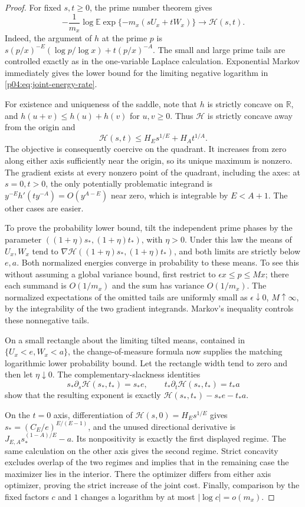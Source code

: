 \documentclass[11pt,letterpaper]{article}
\theoremstyle{definition}
\theoremstyle{remark}
\newcommand{\1}{\mathbf 1}
\begin{document}
\begin{proof}
For fixed $s,t\ge0$, the prime number theorem gives
\begin{equation}\label{p04:eq:joint-laplace-limit}
 -\frac1{m_x}\log\mathbb E
       \exp\{-m_x(sU_x+tW_x)\}
 \longrightarrow\mathcal H(s,t).
\end{equation}
Indeed, the argument of $h$ at the prime $p$ is
$s(p/x)^{-E}(\log p/\log x)+t(p/x)^{-A}$.
The small and large prime tails are controlled exactly as in the
one-variable Laplace calculation. Exponential Markov immediately
gives the lower bound for the limiting negative logarithm in
\eqref{p04:eq:joint-energy-rate}.

For existence and uniqueness of the saddle, note that $h$ is strictly
concave on $\mathbb R$, and $h(u+v)\le h(u)+h(v)$ for $u,v\ge0$.
Thus $\mathcal H$ is strictly concave away from the origin and
\[
 \mathcal H(s,t)\le H_Es^{1/E}+H_At^{1/A}.
\]
The objective is consequently coercive on the quadrant. It increases
from zero along either axis sufficiently near the origin, so its
unique maximum is nonzero. The gradient exists at every nonzero
point of the quadrant, including the axes: at $s=0,t>0$, the
only potentially problematic integrand is
$y^{-E}h'(ty^{-A})=O(y^{A-E})$ near zero, which is integrable
by $E<A+1$. The other cases are easier.

To prove the probability lower bound, tilt the independent prime
phases by the parameter $((1+\eta)s_*,(1+\eta)t_*)$, with
$\eta>0$. Under this law the means of $U_x,W_x$ tend to
$\nabla\mathcal H((1+\eta)s_*,(1+\eta)t_*)$, and both limits
are strictly below $e,a$. Both normalized energies converge in
probability to these means. To see this without assuming a global
variance bound, first restrict to $\epsilon x\le p\le Mx$;
there each summand is $O(1/m_x)$ and the sum has variance
$O(1/m_x)$. The normalized expectations of the omitted tails
are uniformly small as $\epsilon\downarrow0$, $M\uparrow\infty$,
by the integrability of the two gradient integrands. Markov's
inequality controls these nonnegative tails.

On a small rectangle about the limiting tilted means, contained in
$\{U_x<e,W_x<a\}$, the change-of-measure formula now supplies
the matching logarithmic lower probability bound. Let the rectangle
width tend to zero and then let $\eta\downarrow0$.
The complementary-slackness identities
\[
 s_*\partial_s\mathcal H(s_*,t_*)=s_*e,\qquad
 t_*\partial_t\mathcal H(s_*,t_*)=t_*a
\]
show that the resulting exponent is exactly
$\mathcal H(s_*,t_*)-s_*e-t_*a$.

On the $t=0$ axis, differentiation of
$\mathcal H(s,0)=H_Es^{1/E}$ gives
$s_*=(C_E/e)^{E/(E-1)}$, and the unused directional derivative
is $J_{E,A}s_*^{(1-A)/E}-a$. Its nonpositivity is exactly the
first displayed regime. The same calculation on the other axis
gives the second regime. Strict concavity excludes overlap of the
two regimes and implies that in the remaining case the maximizer
lies in the interior. There the optimizer differs from either
axis optimizer, proving the strict increase of the joint cost.
Finally, comparison by the fixed factors $c$ and $1$ changes a
logarithm by at most $|\log c|=o(m_x)$.
\end{proof}
\end{document}
